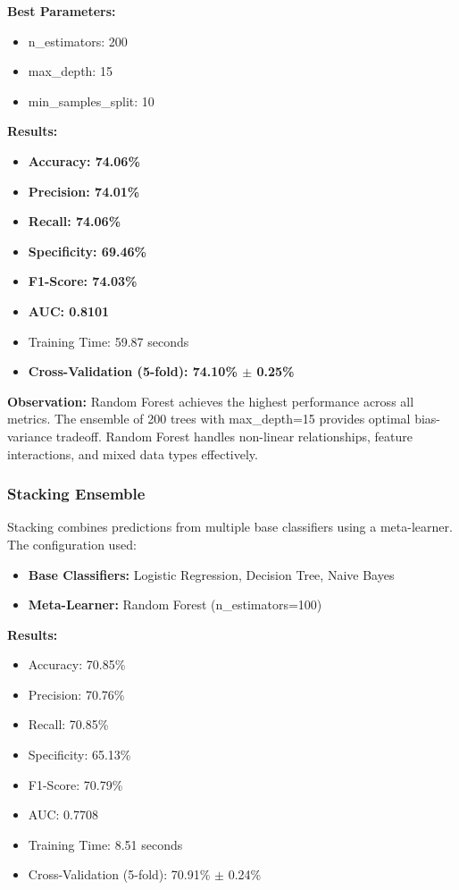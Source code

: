 \documentclass[12pt,man]{apa7}
\begin{document}
\textbf{Best Parameters:}
\begin{itemize}
    \item n\_estimators: 200
    \item max\_depth: 15
    \item min\_samples\_split: 10
\end{itemize}

\textbf{Results:}
\begin{itemize}
    \item \textbf{Accuracy: 74.06\%}
    \item \textbf{Precision: 74.01\%}
    \item \textbf{Recall: 74.06\%}
    \item \textbf{Specificity: 69.46\%}
    \item \textbf{F1-Score: 74.03\%}
    \item \textbf{AUC: 0.8101}
    \item Training Time: 59.87 seconds
    \item \textbf{Cross-Validation (5-fold): 74.10\% $\pm$ 0.25\%}
\end{itemize}

\textbf{Observation:} Random Forest achieves the highest performance across all metrics. The ensemble of 200 trees with max\_depth=15 provides optimal bias-variance tradeoff. Random Forest handles non-linear relationships, feature interactions, and mixed data types effectively.

\subsubsection{Stacking Ensemble}

Stacking combines predictions from multiple base classifiers using a meta-learner. The configuration used:
\begin{itemize}
    \item \textbf{Base Classifiers:} Logistic Regression, Decision Tree, Naive Bayes
    \item \textbf{Meta-Learner:} Random Forest (n\_estimators=100)
\end{itemize}

\textbf{Results:}
\begin{itemize}
    \item Accuracy: 70.85\%
    \item Precision: 70.76\%
    \item Recall: 70.85\%
    \item Specificity: 65.13\%
    \item F1-Score: 70.79\%
    \item AUC: 0.7708
    \item Training Time: 8.51 seconds
    \item Cross-Validation (5-fold): 70.91\% $\pm$ 0.24\%
\end{itemize}
\end{document}

